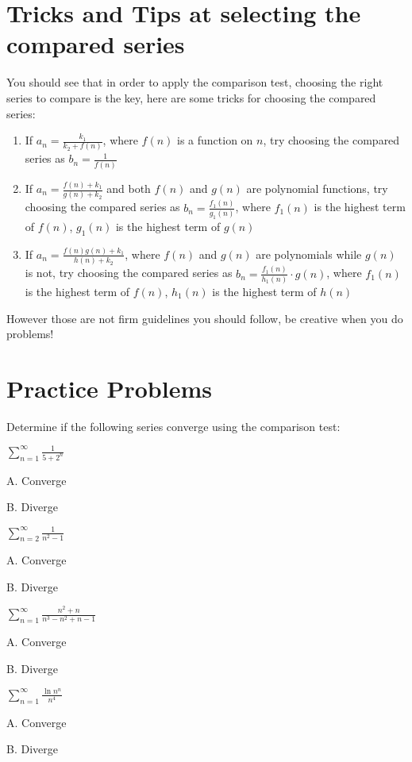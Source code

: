 \documentclass{article}
\numberwithin{equation}{section}
\begin{document}
\section{Tricks and Tips at selecting the compared series}
You should see that in order to apply the comparison test, choosing the right series to compare is the key, here are some tricks for choosing the compared series:
\begin{enumerate}
    \item If $\displaystyle a_n = \frac{k_1}{k_2 + f(n)}$, where $f(n)$ is a function on $n$, try choosing the compared series as $\displaystyle b_n = \frac{1}{f(n)}$
    \item If $\displaystyle a_n = \frac{f(n) + k_1}{g(n) + k_2}$ and both $f(n)$ and $g(n)$ are polynomial functions, try choosing the compared series as $\displaystyle b_n = \frac{f_1(n)}{g_1(n)}$, where $f_1(n)$ is the highest term of $f(n)$, $g_1(n)$ is the highest term of $g(n)$
    \item If $\displaystyle a_n = \frac{f(n)g(n) + k_1}{h(n) + k_2}$, where $f(n)$ and $g(n)$ are polynomials while $g(n)$ is not, try choosing the compared series as $\displaystyle b_n = \frac{f_1(n)}{h_1(n)}\cdot g(n)$, where $f_1(n)$ is the highest term of $f(n)$, $h_1(n)$ is the highest term of $h(n)$
\end{enumerate}
However those are not firm guidelines you should follow, be creative when you do problems!

\section{Practice Problems}
Determine if the following series converge using the comparison test:

$\displaystyle \sum_{n=1}^{\infty} \frac{1}{5+2^n}$

A. Converge 

B. Diverge 

$\displaystyle \sum_{n=2}^{\infty} \frac{1}{n^2-1}$

A. Converge 

B. Diverge 

$\displaystyle \sum_{n=1}^{\infty} \frac{n^2+n}{n^3-n^2+n-1}$

A. Converge 

B. Diverge 

$\displaystyle \sum_{n=1}^{\infty} \frac{\ln n^n}{n^4}$

A. Converge 

B. Diverge 
\end{document}
